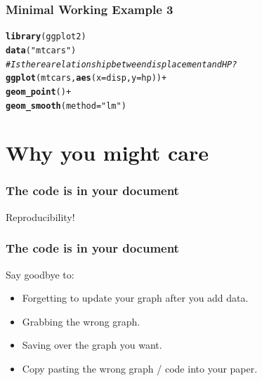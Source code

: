 \documentclass[dvipsnames]{beamer}\usepackage[]{graphicx}\usepackage[]{color}
\makeatletter
\newcommand{\hlstr}[1]{\textcolor[rgb]{0.192,0.494,0.8}{#1}}%
\newcommand{\hlcom}[1]{\textcolor[rgb]{0.678,0.584,0.686}{\textit{#1}}}%
\newcommand{\hlopt}[1]{\textcolor[rgb]{0,0,0}{#1}}%
\newcommand{\hlstd}[1]{\textcolor[rgb]{0.345,0.345,0.345}{#1}}%
\newcommand{\hlkwc}[1]{\textcolor[rgb]{0.333,0.667,0.333}{#1}}%
\newcommand{\hlkwd}[1]{\textcolor[rgb]{0.737,0.353,0.396}{\textbf{#1}}}%
\newenvironment{kframe}{%
 \def\at@end@of@kframe{}%
 \ifinner\ifhmode%
  \def\at@end@of@kframe{\end{minipage}}%
  \begin{minipage}{\columnwidth}%
 \fi\fi%
 \def\FrameCommand##1{\hskip\@totalleftmargin \hskip-\fboxsep
 \colorbox{shadecolor}{##1}\hskip-\fboxsep
     \hskip-\linewidth \hskip-\@totalleftmargin \hskip\columnwidth}%
 \MakeFramed {\advance\hsize-\width
   \@totalleftmargin\z@ \linewidth\hsize
   \@setminipage}}%
 {\par\unskip\endMakeFramed%
 \at@end@of@kframe}
\newenvironment{knitrout}{}{} %
\makeatother
\begin{document}
%

\begin{frame}[fragile]
  \frametitle{Minimal Working Example 3}
  
\begin{knitrout}\tiny
{}\color{fgcolor}\begin{kframe}
\begin{alltt}
\hlkwd{library}\hlstd{(ggplot2)}
\hlkwd{data}\hlstd{(}\hlstr{"mtcars"}\hlstd{)}
\hlcom{# Is there a relationship between displacement and HP?}
\hlkwd{ggplot}\hlstd{(mtcars,} \hlkwd{aes}\hlstd{(}\hlkwc{x}\hlstd{=disp,} \hlkwc{y}\hlstd{=hp))} \hlopt{+}
\hlkwd{geom_point}\hlstd{()}\hlopt{+}
\hlkwd{geom_smooth}\hlstd{(}\hlkwc{method} \hlstd{=} \hlstr{"lm"}\hlstd{)}
\end{alltt}
\end{kframe}
\end{knitrout}
    
        
\end{frame}

%

\section{Why you might care}

%

\begin{frame}[fragile]
  \frametitle{The code is in your document}
  
  Reproducibility!
  
\end{frame}

%

\begin{frame}[fragile]
  \frametitle{The code is in your document}
  
  Say goodbye to:
  \begin{itemize}
    \item Forgetting to update your graph after you add data.
    \item Grabbing the wrong graph.
    \item Saving over the graph you want.
    \item Copy pasting the wrong graph / code into your paper.
  \end{itemize}
\end{frame}
\end{document}
